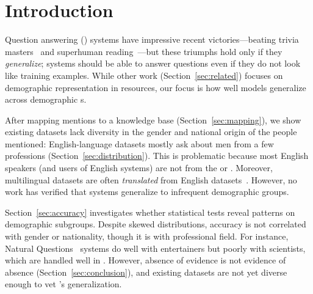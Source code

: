 
\section{Introduction}

Question answering () systems have impressive recent victories---beating trivia masters~\cite{ferruci-10} and superhuman reading~\cite{najberg-18}---but these triumphs hold only if they \emph{generalize};  systems should be able to answer questions even if they do not look like training examples.
While other work (Section~\ref{sec:related}) focuses on demographic representation in  resources, our focus is how well  models generalize across demographic \demosubset{}s.

After mapping mentions to a knowledge base (Section~\ref{sec:mapping}), we show existing  datasets lack diversity in the gender and national origin of the people mentioned: English-language  datasets mostly ask about  men from a few professions  (Section~\ref{sec:distribution}).
This is problematic because most English speakers (and users of English  systems) are not from the  or .
Moreover, multilingual  datasets are often \emph{translated} from English datasets~\cite{lewis-etal-2020-mlqa,
  artetxe2019xquad}.
However, no work has verified that  systems generalize to infrequent demographic groups.

Section~\ref{sec:accuracy} investigates whether statistical tests reveal patterns on demographic subgroups.  
Despite skewed distributions, accuracy is not correlated with gender or nationality, though it is with professional field.
For instance, Natural Questions~\cite[]{kwiatkowski-19} systems do well with entertainers but poorly with scientists, which are handled well in \triviaqa{}.
However, absence of evidence is not evidence of absence (Section~\ref{sec:conclusion}), and existing  datasets are not yet diverse enough to vet 's generalization.
